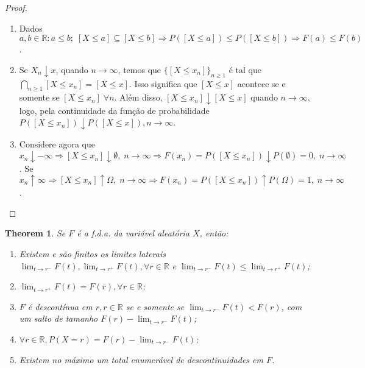 \documentclass[
]{article}
\newtheorem{theorem}{Theorem}[section]
\theoremstyle{definition}
\theoremstyle{definition}
\theoremstyle{definition}
\theoremstyle{definition}
\theoremstyle{remark}
\begin{document}
\begin{proof}
\leavevmode

\begin{enumerate}
\def\labelenumi{\alph{enumi})}
\item
  Dados \(a,b \in \mathbb{R} : a \le b; \; [X \le a] \subseteq [X \le b] \Rightarrow P([X \le a]) \le P([X \le b]) \Rightarrow F(a) \le F(b)\).
\item
  Se \(X_{n}\downarrow x\), quando \(n \to \infty\), temos que \(\{[X \le x_{n}]\}_{n \ge 1}\) é tal que \(\bigcap_{n \ge 1}[X \le x_{n}] = [X \le x]\). Isso significa que \([X \le x]\) acontece se e somente se \([X \le x_{n}] \; \forall n\). Além disso, \([X \le x_{n}] \downarrow [X \le x]\) quando \(n \to \infty\), logo, pela continuidade da função de probabilidade \(P([X \le x_{n}]) \downarrow P([X \le x]), n \to \infty\).
\item
  Considere agora que \(x_{n} \downarrow -\infty \Rightarrow [X \le x_{n}] \downarrow \emptyset, \; n \to \infty \Rightarrow F(x_{n}) = P([X \le x_{n}]) \downarrow P(\emptyset) = 0, \; n \to \infty\).
  Se \(x_{n} \uparrow \infty \Rightarrow [X \le x_{n}] \uparrow \Omega, \; n \to \infty \Rightarrow F(x_{n}) = P([X \le x_{n}]) \uparrow P(\Omega) = 1, \; n \to \infty\).
\end{enumerate}

\end{proof}

\begin{theorem}

Se \(F\) é a f.d.a. da variável aleatória \(X\), então:

\begin{enumerate}
\def\labelenumi{\alph{enumi})}
\item
  Existem e são finitos os limites laterais \(\lim_{t \to r^{-}}F(t), \lim_{t \to r^{+}}F(t), \forall r \in \mathbb{R}\) e \(\lim_{t \to r^{-}}F(t) \le \lim_{t \to r^{+}}F(t)\);
\item
  \(\lim_{t \to r^{+}}F(t) = F(r), \forall r \in \mathbb{R}\);
\item
  \(F\) é descontínua em \(r, r \in \mathbb{R}\) se e somente se \(\lim_{t \to r^{-}}F(t) < F(r)\), com um salto de tamanho \(F(r) - \lim_{t \to r^{-}}F(t)\);
\item
  \(\forall r \in \mathbb{R}, P(X = r) = F(r) - \lim_{t \to r^{-}}F(t)\);
\item
  Existem no máximo um total enumerável de descontinuidades em \(F\).
\end{enumerate}

\end{theorem}
\end{document}
